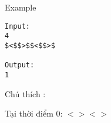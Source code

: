 Example
\begin{verbatim}
Input:
4
$<$$>$$<$$>$

Output:
1
\end{verbatim}  Chú thích :  


  Tại thời điểm 0: $<$$>$$<$$>$